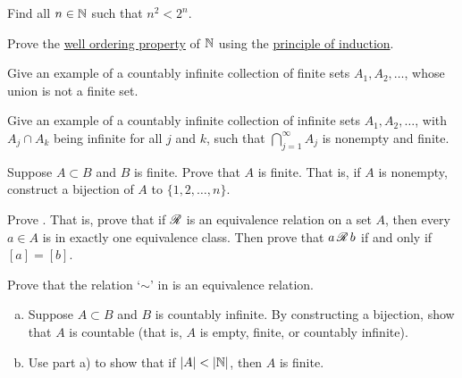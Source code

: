 \begin{exercise}
Find all $n \in {\mathbb{N}}$ such that $n^2 < 2^n$.
\end{exercise}

\begin{exercise}
Prove the 
\hyperlink{wop:link}{well ordering property} of ${\mathbb{N}}$ using the
\hyperref[induction:thm]{principle of induction}.
\end{exercise}


\begin{exercise}
Give an example of a countably infinite collection of finite sets $A_1, A_2, \ldots$,
whose union is not a finite set.
\end{exercise}

\begin{exercise}
Give an example of a countably infinite collection of infinite sets $A_1, A_2, \ldots$,
with $A_j \cap A_k$ being infinite for all $j$ and $k$, such that
$\bigcap_{j=1}^\infty A_j$
is nonempty and finite.
\end{exercise}

\begin{exercise}
Suppose $A \subset B$ and $B$ is finite. Prove that $A$ is finite.
That is, if $A$ is nonempty, construct a bijection of $A$ to $\{ 1,2,\ldots,n \}$.
\end{exercise}

\begin{exercise}
Prove .  That is, prove that if ${\mathscr{R}}$ is an
equivalence relation on a set $A$, then every $a \in A$ is in exactly one
equivalence class.  Then prove that $a \, {\mathscr{R}} \, b$ if and only if $[a] =
[b]$.
\end{exercise}

\begin{exercise}
Prove that the relation `$\sim$'
in  is an equivalence
relation.
\end{exercise}

\begin{exercise}
\leavevmode
\begin{enumerate}[a)]
\item
Suppose $A \subset B$ and $B$ is countably infinite.  By constructing a
bijection, show that $A$ is
countable (that is, $A$ is empty, finite, or countably infinite).
\item 
Use part a) to show that if $\lvert {A} \rvert < \lvert {{\mathbb{N}}} \rvert$, then $A$ is finite.
\end{enumerate}
\end{exercise}

